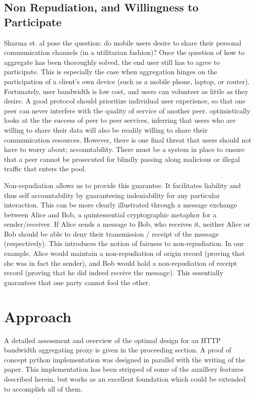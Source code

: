 \documentclass[12pt]{article}
\begin{document}
\subsection{Non Repudiation, and Willingness to Participate}

	Sharma et. al pose the question: do mobile users desire to share their personal communication channels (in a utilitarian fashion)? Once the question of how to aggregate has been thoroughly solved, the end user still has to agree to participate. This is especially the case when aggregation hinges on the participation of a client's own device (such as a mobile phone, laptop, or router). Fortunately, user bandwidth is low cost, and users can volunteer as little as they desire. A good protocol should prioritize individual user experience, so that one peer can never interfere with the quality of service of another peer. \cite{1363842} optimistically looks at the the success of peer to peer services, inferring that users who are willing to share their data will also be readily willing to share their communication resources. However, there is one final threat that users should not have to worry about; accountability. There must be a system in place to ensure that a peer cannot be prosecuted for blindly passing along malicious or illegal traffic that enters the pool.

	Non-repudiation allows us to provide this guarantee. It facilitates liability and thus self accountability by guaranteeing indeniability for any particular interaction. This can be more clearly illustrated through a message exchange between Alice and Bob, a quintessential cryptographic metaphor for a sender/receiver. If Alice sends a message to Bob, who receives it, neither Alice or Bob should be able to deny their transmission / receipt of the message (respectively). This introduces the notion of fairness to non-repudiation. In our example, Alice would maintain a non-repudiation of origin record (proving that she was in fact the sender), and Bob would hold a non-repudiation of receipt record (proving that he did indeed receive the message). This essentially guarantees that one party cannot fool the other\cite{Kremer20021606}.



\section{Approach}

	A detailed assessment and overview of the optimal design for an HTTP bandwidth aggregating proxy is given in the proceeding section. A proof of concept python implementation was designed in parallel with the writing of the paper. This implementation has been stripped of some of the auxillery features described herein, but works as an excellent foundation which could be extended to accomplish all of them.
\end{document}
